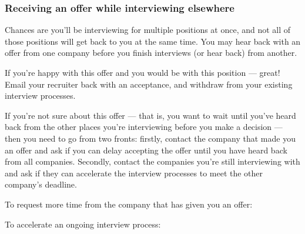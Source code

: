\subsubsection{Receiving an offer while interviewing elsewhere}

Chances are you'll be interviewing for multiple positions at once, and not all of those positions will get back to you at the same time. You may hear back with an offer from one company before you finish interviews (or hear back) from another. 

If you're happy with this offer and you would be with this position --- great! Email your recruiter back with an acceptance, and withdraw from your existing interview processes. 

If you're not sure about this offer --- that is, you want to wait until you've heard back from the other places you're interviewing before you make a decision --- then you need to go from two fronts: firstly, contact the company that made you an offer and ask if you can delay accepting the offer until you have heard back from all companies. Secondly, contact the companies you're still interviewing with and ask if they can accelerate the interview processes to meet the other company's deadline. 

To request more time from the company that has given you an offer:

	
To accelerate an ongoing interview process:


